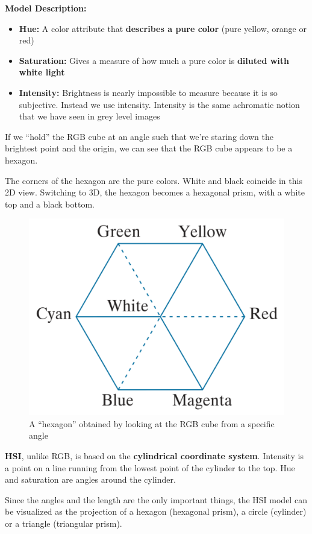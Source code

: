 \textbf{Model Description:}

\begin{itemize}
  \item \textbf{Hue:} A color attribute that \textbf{describes a pure color}
    (pure yellow, orange or red)
  \item \textbf{Saturation:} Gives a measure of how much a pure
    color is \textbf{diluted with white light}
  \item \textbf{Intensity:} Brightness is nearly impossible to
    measure because it is so subjective. Instead we use intensity.
    Intensity is the same achromatic notion that we have seen in grey
    level images
\end{itemize}

If we \enquote{hold} the RGB cube at an angle such that we're staring
down the brightest point and the origin, we can see that the RGB cube
appears to be a hexagon.

The corners of the hexagon are the pure colors. White and black
coincide in this 2D view. Switching to 3D, the hexagon becomes a
hexagonal prism, with a white top and a black bottom.

\begin{figure}[H]
  \centering
  \includegraphics[width=0.6\linewidth]{images/hsi_hexagon.png}
  \caption{A \enquote{hexagon} obtained by looking at the RGB cube
  from a specific angle}
\end{figure}

\textbf{HSI}, unlike RGB, is based on the \textbf{cylindrical
coordinate system}. Intensity is a point on a line running from the
lowest point of the cylinder to the top. Hue and saturation are
angles around the cylinder.

Since the angles and the length are the only important things, the
HSI model can be visualized as the projection of a hexagon (hexagonal
prism), a circle (cylinder) or a triangle (triangular prism).

